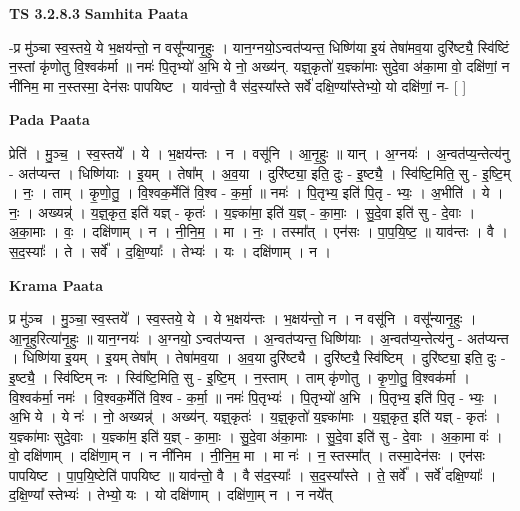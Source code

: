 \documentclass[17pt]{extarticle}
\begin{document}
\textbf{TS 3.2.8.3 } \newline
\textbf{Samhita Paata} \newline

-प्र मु॑ञ्चा स्व॒स्तये॒ ये भ॒क्षय॑न्तो॒ न वसू᳚न्यानृ॒हुः । यान॒ग्नयो॒ऽन्वत॑प्यन्त॒ धिष्णि॑या इ॒यं तेषा॑मव॒या दुरि॑ष्ट्यै॒ स्वि॑ष्टिं न॒स्तां कृ॑णोतु वि॒श्वक॑र्मा ॥ नमः॑ पि॒तृभ्यो॑ अ॒भि ये नो॒ अख्य॑न्. यज्ञ्॒कृतो॑ य॒ज्ञ्का॑माः सुदे॒वा अ॑का॒मा वो॒ दक्षि॑णां॒ न नी॑निम॒ मा न॒स्तस्मा॒ देन॑सः पापयिष्ट । याव॑न्तो॒ वै स॑द॒स्या᳚स्ते सर्वे॑ दक्षि॒ण्या᳚स्तेभ्यो॒ यो दक्षि॑णां॒ न-  [  ] \newline

\textbf{Pada Paata} \newline

प्रेति॑ । मु॒ञ्च॒ । स्व॒स्तये᳚ । ये । भ॒क्षय॑न्तः । न । वसू॑नि । आ॒नृ॒हुः ॥ यान् । अ॒ग्नयः॑ । अ॒न्वत॑प्य॒न्तेत्य॑नु - अत॑प्यन्त । धिष्णि॑याः । इ॒यम् । तेषा᳚म् । अ॒व॒या । दुरि॑ष्ट्या॒ इति॒ दुः - इ॒ष्ट्यै॒ । स्वि॑ष्टि॒मिति॒ सु - इ॒ष्टि॒म् । नः॒ । ताम् । कृ॒णो॒तु॒ । वि॒श्वक॒र्मेति॑ वि॒श्व - क॒र्मा॒ ॥ नमः॑ । पि॒तृभ्य॒ इति॑ पि॒तृ - भ्यः॒ । अ॒भीति॑ । ये । नः॒ । अख्यन्न्॑ । य॒ज्ञ्॒कृत॒ इति॑ यज्ञ् - कृतः॑ । य॒ज्ञ्का॑मा॒ इति॑ य॒ज्ञ् - का॒माः॒ । सु॒दे॒वा इति॑ सु - दे॒वाः । अ॒का॒माः । वः॒ । दक्षि॑णाम् । न । नी॒नि॒म॒ । मा । नः॒ । तस्मा᳚त् । एन॑सः । पा॒प॒यि॒ष्ट॒ ॥ याव॑न्तः । वै । स॒द॒स्याः᳚ । ते । सर्वे᳚ । द॒क्षि॒ण्याः᳚ । तेभ्यः॑ । यः । दक्षि॑णाम् । न ।  \newline


\textbf{Krama Paata} \newline

प्र मु॑ञ्च । मु॒ञ्चा॒ स्व॒स्तये᳚ । स्व॒स्तये॒ ये । ये भ॒क्षय॑न्तः । भ॒क्षय॑न्तो॒ न । न वसू॑नि । वसू᳚न्यानृ॒हुः । आ॒नृ॒हुरित्या॑नृ॒हुः ॥ यान॒ग्नयः॑ । अ॒ग्नयो॒ ऽन्वत॑प्यन्त । अ॒न्वत॑प्यन्त॒ धिष्णि॑याः । अ॒न्वत॑प्य॒न्तेत्य॑नु - अत॑प्यन्त । धिष्णि॑या इ॒यम् । इ॒यम् तेषा᳚म् । तेषा॑मव॒या । अ॒व॒या दुरि॑ष्ट्यै । दुरि॑ष्ट्यै॒ स्वि॑ष्टिम् । दुरि॑ष्ट्या॒ इति॒ दुः - इ॒ष्ट्यै॒ । स्वि॑ष्टिम् नः । स्वि॑ष्टि॒मिति॒ सु - इ॒ष्टि॒म् । न॒स्ताम् । ताम् कृ॑णोतु । कृ॒णो॒तु॒ वि॒श्वक॑र्मा । वि॒श्वक॑र्मा॒ नमः॑ । वि॒श्वक॒र्मेति॑ वि॒श्व - क॒र्मा॒ ॥ नमः॑ पि॒तृभ्यः॑ । पि॒तृभ्यो॑ अ॒भि । पि॒तृभ्य॒ इति॑ पि॒तृ - भ्यः॒ । अ॒भि ये । ये नः॑ । नो॒ अख्यन्न्॑ । अख्य॑न्. यज्ञ्॒कृतः॑ । य॒ज्ञ्॒कृतो॑ य॒ज्ञ्का॑माः । य॒ज्ञ्॒कृत॒ इति॑ यज्ञ् - कृतः॑ । य॒ज्ञ्का॑माः सुदे॒वाः । य॒ज्ञ्का॑म॒ इति॑ य॒ज्ञ् - का॒माः॒ । सु॒दे॒वा अ॑का॒माः । सु॒दे॒वा इति॑ सु - दे॒वाः । अ॒का॒मा वः॑ । वो॒ दक्षि॑णाम् । दक्षि॑णा॒म् न । न नी॑निम । नी॒नि॒म॒ मा । मा नः॑ । न॒ स्तस्मा᳚त् । तस्मा॒देन॑सः । एन॑सः पापयिष्ट । पा॒प॒यि॒ष्टेति॑ पापयिष्ट ॥ याव॑न्तो॒ वै । वै स॑द॒स्याः᳚ । स॒द॒स्या᳚स्ते । ते॒ सर्वे᳚ । सर्वे॑ दक्षि॒ण्याः᳚ । द॒क्षि॒ण्या᳚ स्तेभ्यः॑ । तेभ्यो॒ यः । यो दक्षि॑णाम् । दक्षि॑णा॒म् न । न नये᳚त् \newline
\end{document}
